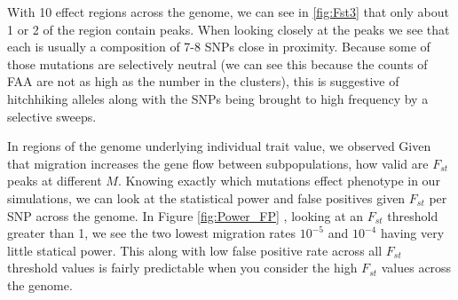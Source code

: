 \documentclass{article}
\begin{document}
With 10 effect regions across the genome, we can see in \ref{fig:Fst3} that only about 1 or 2 of the region contain peaks. 
When looking closely at the peaks we see that each is usually a composition of 7-8 SNPs close in proximity.
Because some of those mutations are selectively neutral (we can see this because the counts of FAA are not as high as the number in the clusters),
this is suggestive of hitchhiking alleles along with the SNPs being brought to high frequency by a selective sweeps.


In regions of the genome underlying individual trait value, we observed 
Given that migration increases the gene flow between subpopulations, how valid are $F_{st}$ peaks at different $M$. 
Knowing exactly which mutations effect phenotype in our simulations, 
we can look at the statistical power and false positives given $F_{st}$ per SNP across the genome. 
In Figure \ref{fig:Power_FP} , looking at an $F_{st}$ threshold greater than 1, we see the two lowest migration rates $10^{-5}$ and $10^{-4}$ having very little statical power. 
This along with low false positive rate across all $F_{st}$ threshold values is fairly predictable when you consider the high $F_{st}$ values across the genome. 

\end{document}
